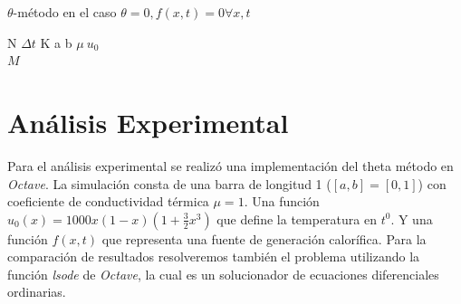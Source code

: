 \documentclass{endm}
\begin{document}
\begin{algorithm}[H] 
\caption{$\theta$-método en el caso $\theta=0, f(x,t)=0 \forall x,t$}
\label{thetalg0}
\small
\centering
\begin{algorithmic}[2]
\Require N $\Delta t$ K a b $\mu \ u_0$ 
    \EndFor
    \EndFor\\
\Return $M$ 
\end{algorithmic}
\end{algorithm}
\section{An\'alisis Experimental}\label{Comparison}

Para el análisis experimental se realizó una implementación del theta método en \textit{Octave}. La simulación consta de una barra de longitud 1 ($[a,b]=[0,1]$) con coeficiente de conductividad térmica $\mu=1$. Una función $u_0(x)=1000x(1-x)(1+\frac{3}{2}x^3)$ que define la temperatura en $t^0$. Y una función $f(x,t)$ que representa una fuente de generación calorífica. 
Para la comparación de resultados resolveremos también el problema utilizando la función \textit{lsode} de \textit{Octave}, la cual es un solucionador de ecuaciones diferenciales ordinarias. \cite{lsode}
\end{document}
